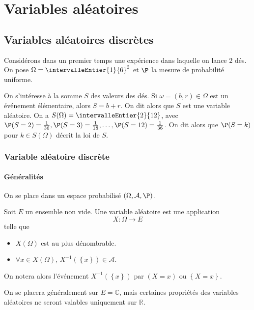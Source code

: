 \chapter{Variables aléatoires}
\chaptertoc

\section{Variables aléatoires discrètes}

Considérons dans un premier temps une expérience dans laquelle on lance $2$ dés. On pose $\Omega = \intervalleEntier{1}{6}^2$ et $\P$ la mesure de probabilité uniforme.

On s’intéresse à la somme $S$ des valeurs des dés. Si $\omega = (b,r) \in \Omega$ est un événement élémentaire, alors $S = b + r$. On dit alors que $S$ est une variable aléatoire. On a $S(\Omega) = \intervalleEntier{2}{12}$, avec $\P(S = 2) = \frac{1}{36}, \P(S = 3) = \frac{1}{18}, \ldots, \P(S = 12) = \frac{1}{36}$. On dit alors que $\P(S = k)$ pour $k \in S(\Omega)$ décrit la loi de $S$.

\subsection{Variable aléatoire discrète}

    \subsubsection{Généralités}

    On se place dans un espace probabilisé $(\Omega, \mathcal{A}, \P)$. 

    \begin{defi}{}{}
        Soit $E$ un ensemble non vide. Une variable aléatoire est une application 
        \[ X : \Omega \to E \]    
        telle que \begin{itemize}
            \item $X(\Omega)$ est au plus dénombrable.
            \item $\forall x \in X(\Omega)$, $X^{-1}(\left\{x\right\}) \in \mathcal{A}$.
        \end{itemize}
        On notera alors l’événement $X^{-1}(\left\{x\right\})$ par $(X = x)$ ou $\left\{X = x\right\}$.
    \end{defi}

    On se placera généralement sur $E = \mathbb{C}$, mais certaines propriétés des variables aléatoires ne seront valables uniquement sur $\mathbb{R}$.

